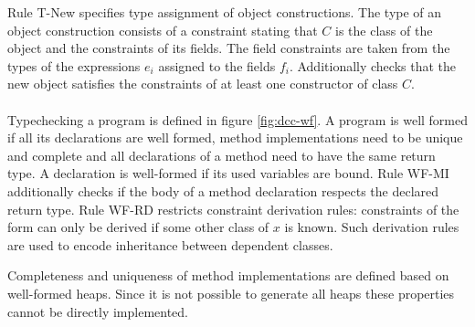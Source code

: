Rule T-New specifies type assignment of object constructions.
The type  of an object construction 
consists of a constraint stating that $C$ is the class of the object and the constraints of its fields.
The field constraints are taken from the types of the expressions $e_i$
assigned to the fields $f_i$.
Additionally  checks
that the new object satisfies the constraints of at least
one constructor  of class $C$.
\\
\\
Typechecking a program is defined in figure \ref{fig:dcc-wf}.
A program is well formed if all its declarations are well formed,
method implementations need to be unique and complete
and all declarations of a method need to have the same return type.
A declaration is well-formed if its used variables are bound.
Rule WF-MI additionally checks if the body of a method declaration
respects the declared return type.
Rule WF-RD restricts constraint derivation rules:
constraints of the form  can only be derived
if some other class of $x$ is known.
Such derivation rules are used to encode inheritance between
dependent classes.

Completeness and uniqueness of method implementations are defined
based on well-formed heaps.
Since it is not possible to generate all heaps
these properties cannot be directly implemented.

